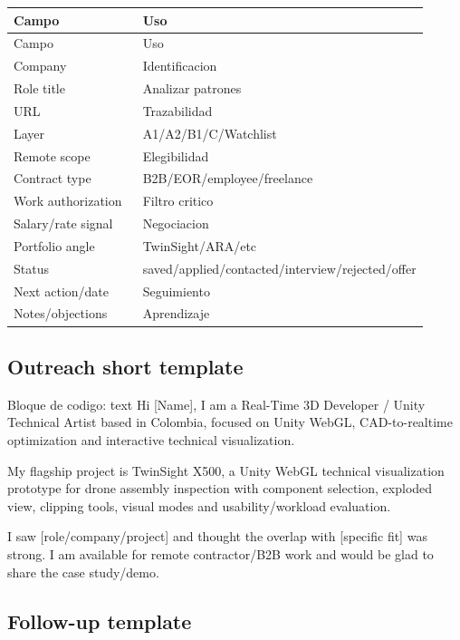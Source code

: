 \begin{center}
\scriptsize
\begin{longtable}{>{\raggedright\arraybackslash}p{0.455\linewidth} >{\raggedright\arraybackslash}p{0.455\linewidth}}
\toprule
Campo & Uso \\
\midrule
\endfirsthead
\toprule
Campo & Uso \\
\midrule
\endhead
Company & Identificacion \\
Role title & Analizar patrones \\
URL & Trazabilidad \\
Layer & A1/A2/B1/C/Watchlist \\
Remote scope & Elegibilidad \\
Contract type & B2B/EOR/employee/freelance \\
Work authorization & Filtro critico \\
Salary/rate signal & Negociacion \\
Portfolio angle & TwinSight/ARA/etc \\
Status & saved/applied/contacted/interview/rejected/offer \\
Next action/date & Seguimiento \\
Notes/objections & Aprendizaje \\
\bottomrule
\end{longtable}
\end{center}


\subsection{Outreach short template}


\begin{mdcode}
Bloque de codigo: text
Hi [Name], I am a Real-Time 3D Developer / Unity Technical Artist based in Colombia, focused on Unity WebGL, CAD-to-realtime optimization and interactive technical visualization.

My flagship project is TwinSight X500, a Unity WebGL technical visualization prototype for drone assembly inspection with component selection, exploded view, clipping tools, visual modes and usability/workload evaluation.

I saw [role/company/project] and thought the overlap with [specific fit] was strong. I am available for remote contractor/B2B work and would be glad to share the case study/demo.
\end{mdcode}


\subsection{Follow-up template}


